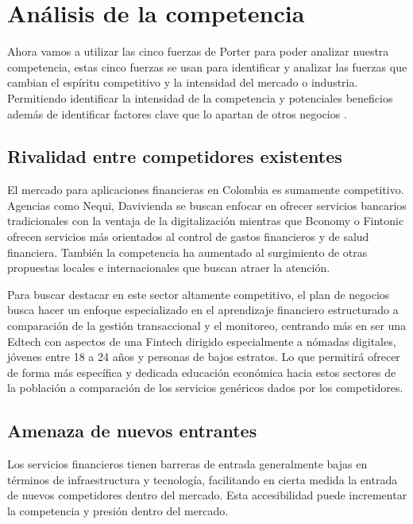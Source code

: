 \section*{Análisis de la competencia}
Ahora vamos a utilizar las cinco fuerzas de Porter para poder analizar nuestra competencia, estas cinco fuerzas se usan para identificar y analizar las fuerzas que cambian el espíritu competitivo y la intensidad del mercado o industria. Permitiendo identificar la intensidad de la competencia y potenciales beneficios además de identificar factores clave que lo apartan de otros negocios \parencite{Investopedia02}.

\subsection*{Rivalidad entre competidores existentes}
El mercado para aplicaciones financieras en Colombia es sumamente competitivo. Agencias como Nequi, Davivienda se buscan enfocar en ofrecer servicios bancarios tradicionales con la ventaja de la digitalización mientras que Bconomy o Fintonic ofrecen servicios más orientados al control de gastos financieros y de salud financiera. También la competencia ha aumentado al surgimiento de otras propuestas locales e internacionales que buscan atraer la atención.

Para buscar destacar en este sector altamente competitivo, el plan de negocios busca hacer un enfoque especializado en el aprendizaje financiero estructurado a comparación de la gestión transaccional y el monitoreo, centrando más en ser una Edtech con aspectos de una Fintech dirigido especialmente a nómadas digitales, jóvenes entre 18 a 24 años y personas de bajos estratos. Lo que permitirá ofrecer de forma más específica y dedicada educación económica hacia estos sectores de la población a comparación de los servicios genéricos dados por los competidores.

\subsection*{Amenaza de nuevos entrantes}
Los servicios financieros tienen barreras de entrada generalmente bajas en términos de infraestructura y tecnología, facilitando en cierta medida la entrada de nuevos competidores dentro del mercado. Esta accesibilidad puede incrementar la competencia y presión dentro del mercado.

